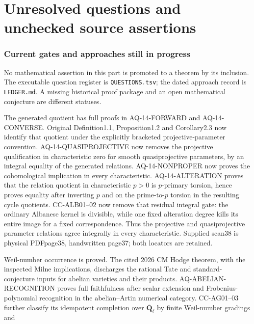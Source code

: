 \clearpage
\part{Unresolved questions and unchecked source assertions}
\section{Current gates and approaches still in progress}
No mathematical assertion in this part is promoted to a theorem by
its inclusion. The executable question register is \texttt{QUESTIONS.tsv};
the dated approach record is \texttt{LEDGER.md}. A missing historical
proof package and an open mathematical conjecture are different statuses.

\begin{description}[style=nextline,leftmargin=0pt]
\item[Cote 14, scans 25--38: original quotient identification.]
The generated quotient has full proofs in AQ-14-FORWARD and
AQ-14-CONVERSE. Original Definition1.1, Proposition1.2 and
Corollary2.3 now identify that quotient under the explicitly bracketed
projective-parameter convention. AQ-14-QUASIPROJECTIVE now removes the projective qualification
in characteristic zero for smooth quasiprojective parameters, by an
integral equality of the generated relations. AQ-14-NONPROPER now
proves the cohomological implication in every characteristic.
AQ-14-ALTERATION proves that the relation quotient in characteristic
$p>0$ is $p$-primary torsion, hence proves equality after inverting $p$
and on the prime-to-$p$ torsion in the resulting cycle quotients.
CC-ALB01--02 now remove that residual integral gate: the ordinary
Albanese kernel is divisible, while one fixed alteration degree kills
its entire image for a fixed correspondence. Thus the projective and
quasiprojective parameter relations agree integrally in every
characteristic. Supplied scan38 is physical PDFpage38,
handwritten page37; both locators are retained.
\item[Cote 15, scans 100--106: full simple-motive classification.]
Weil-number occurrence is proved. The cited 2026 CM Hodge theorem,
with the inspected Milne implications, discharges the rational Tate and
standard-conjecture inputs for abelian varieties and their products.
AQ-ABELIAN-RECOGNITION proves full faithfulness after scalar extension
and Frobenius-polynomial recognition in the abelian--Artin numerical
category. CC-AG01--03 further classify its idempotent completion over
$\overline{\mathbf Q}_\ell$ by finite Weil-number gradings and

\end{description}
